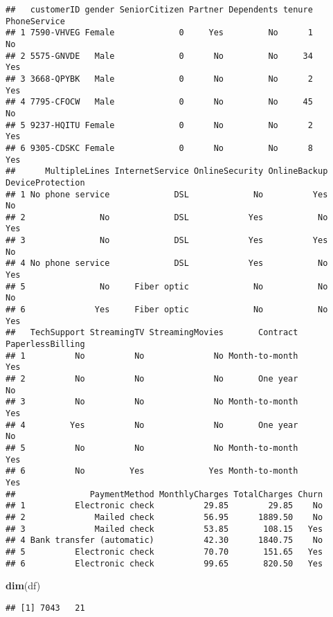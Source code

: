 \documentclass[
]{article}
\newenvironment{Shaded}{\begin{snugshade}}{\end{snugshade}}
\newcommand{\FunctionTok}[1]{\textcolor[rgb]{0.13,0.29,0.53}{\textbf{#1}}}
\newcommand{\NormalTok}[1]{#1}
\begin{document}
\begin{verbatim}
##   customerID gender SeniorCitizen Partner Dependents tenure PhoneService
## 1 7590-VHVEG Female             0     Yes         No      1           No
## 2 5575-GNVDE   Male             0      No         No     34          Yes
## 3 3668-QPYBK   Male             0      No         No      2          Yes
## 4 7795-CFOCW   Male             0      No         No     45           No
## 5 9237-HQITU Female             0      No         No      2          Yes
## 6 9305-CDSKC Female             0      No         No      8          Yes
##      MultipleLines InternetService OnlineSecurity OnlineBackup DeviceProtection
## 1 No phone service             DSL             No          Yes               No
## 2               No             DSL            Yes           No              Yes
## 3               No             DSL            Yes          Yes               No
## 4 No phone service             DSL            Yes           No              Yes
## 5               No     Fiber optic             No           No               No
## 6              Yes     Fiber optic             No           No              Yes
##   TechSupport StreamingTV StreamingMovies       Contract PaperlessBilling
## 1          No          No              No Month-to-month              Yes
## 2          No          No              No       One year               No
## 3          No          No              No Month-to-month              Yes
## 4         Yes          No              No       One year               No
## 5          No          No              No Month-to-month              Yes
## 6          No         Yes             Yes Month-to-month              Yes
##               PaymentMethod MonthlyCharges TotalCharges Churn
## 1          Electronic check          29.85        29.85    No
## 2              Mailed check          56.95      1889.50    No
## 3              Mailed check          53.85       108.15   Yes
## 4 Bank transfer (automatic)          42.30      1840.75    No
## 5          Electronic check          70.70       151.65   Yes
## 6          Electronic check          99.65       820.50   Yes
\end{verbatim}

\begin{Shaded}
\begin{Highlighting}[]
\FunctionTok{dim}\NormalTok{(df)}
\end{Highlighting}
\end{Shaded}

\begin{verbatim}
## [1] 7043   21
\end{verbatim}
\end{document}
